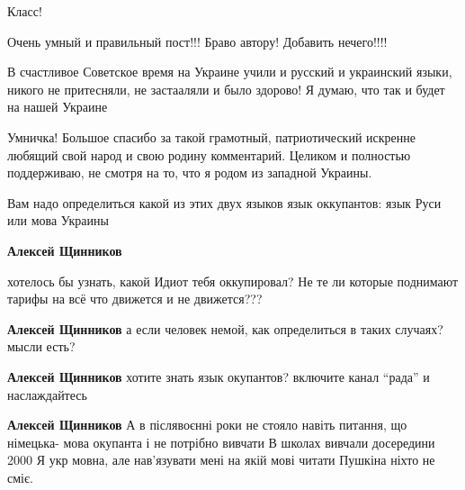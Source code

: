\begin{itemize}
Класс!

Очень умный и правильный пост!!! Браво автору! Добавить нечего!!!!


В счастливое Советское время на Украине учили и русский и украинский языки,
никого не притесняли, не застааляли и было здорово! Я думаю, что так и будет
на нашей Украине



Умничка! Большое спасибо за такой грамотный, патриотический искренне любящий
свой народ и свою родину комментарий. Целиком и полностью поддерживаю, не
смотря на то, что я родом из западной Украины.


Вам надо определиться какой из этих двух языков язык оккупантов: язык Руси или
мова Украины

\begin{itemize}
\textbf{Алексей Щинников} 

хотелось бы узнать, какой Идиот тебя оккупировал? Не те ли которые поднимают
тарифы на всё что движется и не движется???


\textbf{Алексей Щинников} а если человек немой, как определиться в таких случаях? мысли есть?

\textbf{Алексей Щинников} хотите знать язык окупантов? включите канал \enquote{рада} и наслаждайтесь


\textbf{Алексей Щинников} А в післявоєнні роки не стояло навіть питання, що німецька-
мова окупанта і не потрібно вивчати В школах вивчали досередини 2000 Я укр
мовна, але нав'язувати мені на якій мові читати Пушкіна ніхто не сміє.

\end{itemize}



\end{itemize}
